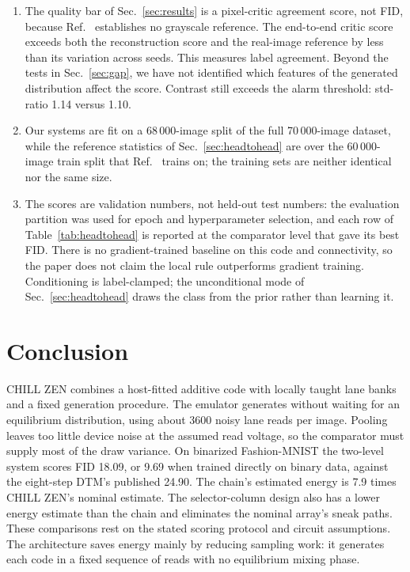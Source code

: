 \documentclass[reprint,amsmath,amssymb,aps,nofootinbib]{revtex4-2}
\begin{document}
\begin{enumerate}
\item The quality bar of Sec.~\ref{sec:results} is a pixel-critic
  agreement score, not FID, because Ref.~\cite{jelincic2025dtm}
  establishes no grayscale reference. The end-to-end critic score exceeds both the reconstruction score and
  the real-image reference by less than its variation across seeds. This
  measures label agreement. Beyond the tests in Sec.~\ref{sec:gap}, we
  have not identified which features of the generated distribution
  affect the score. Contrast still exceeds the alarm threshold:
  std-ratio 1.14 versus 1.10.
\item Our systems are fit on a 68\,000-image split of the full
  70\,000-image dataset, while the reference statistics of
  Sec.~\ref{sec:headtohead} are over the 60\,000-image train split
  that Ref.~\cite{jelincic2025dtm} trains on; the training sets are
  neither identical nor the same size.
\item The scores are validation numbers, not held-out test numbers:
  the evaluation partition was used for epoch and hyperparameter
  selection, and each row of Table~\ref{tab:headtohead} is reported
  at the comparator level that gave its best FID. There is no
  gradient-trained baseline on this code and connectivity, so the
  paper does not claim the local rule outperforms gradient training.
  Conditioning is label-clamped; the unconditional mode of
  Sec.~\ref{sec:headtohead} draws the class from the prior rather
  than learning it.
\end{enumerate}


\section{Conclusion}\label{sec:conclusion}

CHILL ZEN combines a host-fitted additive code with locally taught
lane banks and a fixed generation procedure. The emulator generates
without waiting for an equilibrium distribution, using about 3600
noisy lane reads per image. Pooling leaves too little device noise
at the assumed read voltage, so the comparator must supply most of
the draw variance. On binarized Fashion-MNIST the two-level system
scores FID 18.09, or 9.69 when trained directly on binary data,
against the eight-step DTM's published 24.90. The chain's estimated energy is 7.9 times CHILL ZEN's nominal estimate.
The selector-column design also has a lower energy estimate than the
chain and eliminates the nominal array's sneak paths. These comparisons rest on the stated
scoring protocol and circuit assumptions. The architecture saves energy mainly by reducing sampling work: it
generates each code in a fixed sequence of reads with no equilibrium
mixing phase.
\end{document}
